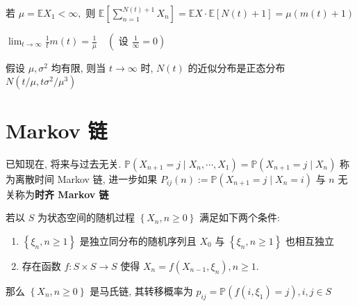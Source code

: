 \documentclass[10pt]{yerbaformat}
\begin{document}
\begin{corollary}
    若 $\mu=\mathbb{E} X_{1}<\infty,$ 则 $\mathbb{E}\left[\sum_{n=1}^{N(t)+1} X_{n}\right]=\mathbb{E} X \cdot \mathbb{E}[N(t)+1]=\mu(m(t)+1)$
\end{corollary}

\begin{theorem}[基本更新定理]
    $\lim _{t \rightarrow \infty} \frac{1}{t} m(t)=\frac{1}{\mu} \quad\left(\right.$ 设 $\left.\frac{1}{\infty}=0\right)$
\end{theorem}

\begin{theorem}[中心极限定理]
    假设 $\mu, \sigma^{2}$ 均有限, 则当 $t \rightarrow \infty$ 时, $N(t)$ 的近似分布是正态分布 $ N\left(t / \mu, t \sigma^{2} / \mu^{3}\right) $
\end{theorem}

\section{Markov 链}

\begin{definition}[无后效性]
    已知现在, 将来与过去无关. $\mathbb{P}\left(X_{n+1}=j \mid X_{n}, \cdots, X_{1}\right)=\mathbb{P}\left(X_{n+1}=j \mid X_{n}\right)$ 称为离散时间 Markov 链, 进一步如果 $P_{i j}(n):=\mathbb{P}\left(X_{n+1}=j \mid X_{n}=i\right)$ 与 $n$ 无关称为\textbf{时齐 Markov 链}
\end{definition}


\begin{theorem}
    若以 $S$ 为状态空间的随机过程 $\left\{X_{n}, n \geq 0\right\}$ 满足如下两个条件:
    \begin{enumerate}
        \item $\left\{\xi_{n}, n \geq 1\right\}$ 是独立同分布的随机序列且 $X_{0}$ 与 $\left\{\xi_{n}, n \geq 1\right\}$ 也相互独立
        \item 存在函数 $f: S \times S \rightarrow S$ 使得 $X_{n}=f\left(X_{n-1}, \xi_{n}\right), n \geq 1 .$
    \end{enumerate}
    那么 $\left\{X_{n}, n \geq 0\right\}$ 是马氏链, 其转移概率为 $p_{i j}=\mathbb{P}\left(f\left(i, \xi_{1}\right)=j\right), i, j \in S$
\end{theorem}
\end{document}
